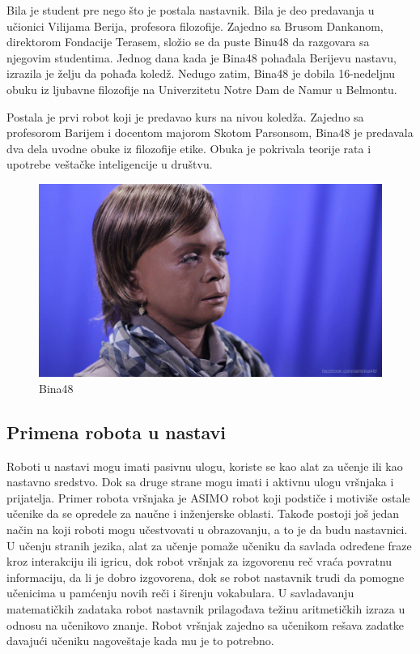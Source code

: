\documentclass[a4paper]{article}
\begin{document}
Bila je student pre nego što je postala nastavnik. Bila je deo predavanja u učionici Vilijama Berija, profesora filozofije. Zajedno sa Brusom Dankanom, direktorom Fondacije Terasem, složio se da puste Binu48 da razgovara sa njegovim studentima. Jednog dana kada je Bina48 pohađala Berijevu nastavu, izrazila je želju da pohađa koledž. Nedugo zatim, Bina48 je dobila 16-nedeljnu obuku iz ljubavne filozofije na Univerzitetu Notre Dam de Namur u Belmontu.

Postala je prvi robot koji je predavao kurs na nivou koledža. Zajedno sa profesorom Barijem i docentom majorom Skotom Parsonsom, Bina48 je predavala dva dela uvodne obuke iz filozofije etike. Obuka je pokrivala teorije rata i upotrebe veštačke inteligencije u društvu. 
 
\begin{figure}[ht!]
\begin{center}
\includegraphics[scale=0.3]{Bina48.jpg}
\end{center}
\caption{Bina48}
\label{fig:bina48}
\end{figure}

\newpage
\subsection{Primena robota u nastavi}
\label{subsec:podnaslov2}

Roboti u nastavi mogu imati pasivnu ulogu, koriste se kao alat za učenje ili kao nastavno sredstvo. Dok sa druge strane mogu imati i aktivnu ulogu vršnjaka i prijatelja. Primer robota vršnjaka je ASIMO robot koji podstiče i motiviše ostale učenike da se opredele za naučne i inženjerske oblasti. Takođe postoji još jedan način na koji roboti mogu učestvovati u obrazovanju, a to je da budu nastavnici. \\
U učenju stranih jezika, alat za učenje pomaže učeniku da savlada određene fraze kroz interakciju ili igricu, dok robot vršnjak za izgovorenu reč vraća povratnu informaciju, da li je dobro izgovorena, dok se robot nastavnik trudi da pomogne učenicima u pamćenju novih reči i širenju vokabulara. 
U savladavanju matematičkih zadataka robot nastavnik prilagođava težinu aritmetičkih izraza u odnosu na učenikovo znanje. Robot vršnjak zajedno sa učenikom rešava zadatke davajući učeniku nagoveštaje kada mu je to potrebno.
\end{document}

